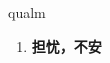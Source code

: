 
\begin{frame}
{\huge qualm}
\begin{center}
\begin{enumerate}\Large
  \item \textbf{担忧，不安}
\end{enumerate}
\end{center}
\end{frame}
